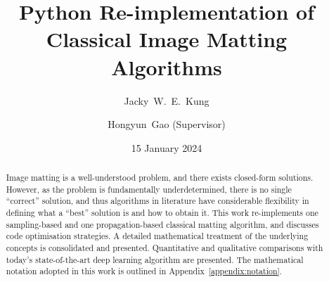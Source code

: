\documentclass{article}
\title{\vspace{-3em} Python Re-implementation of Classical Image Matting Algorithms}
\author{Jacky~W.~E.~Kung \and Hongyun~Gao (Supervisor)}
\date{15 January 2024}
\theoremstyle{definition}
\begin{document}
\doparttoc %
\faketableofcontents %


\maketitle
\begin{abstract}
    Image matting is a well-understood problem, and there exists closed-form solutions. However, as the problem is fundamentally underdetermined, there is no single ``correct'' solution, and thus algorithms in literature have considerable flexibility in defining what a ``best'' solution is and how to obtain it. This work re-implements one sampling-based and one propagation-based classical matting algorithm, and discusses code optimisation strategies. A detailed mathematical treatment of the underlying concepts is consolidated and presented. Quantitative and qualitative comparisons with today's state-of-the-art deep learning algorithm are presented. The mathematical notation adopted in this work is outlined in Appendix~\ref{appendix:notation}.
\end{abstract}
\end{document}
